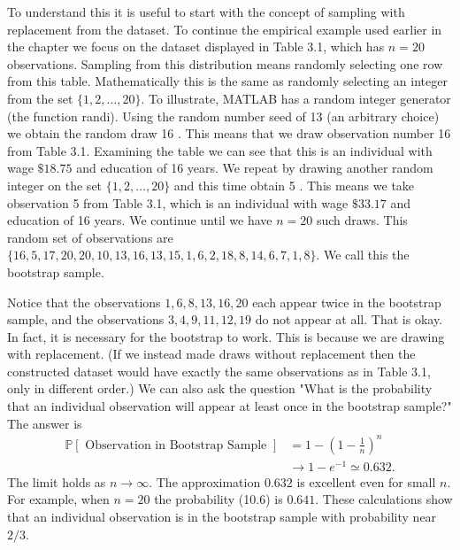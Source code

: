 \documentclass[10pt]{article}
\begin{document}
To understand this it is useful to start with the concept of sampling with replacement from the dataset. To continue the empirical example used earlier in the chapter we focus on the dataset displayed in Table 3.1, which has $n=20$ observations. Sampling from this distribution means randomly selecting one row from this table. Mathematically this is the same as randomly selecting an integer from the set $\{1,2, \ldots, 20\}$. To illustrate, MATLAB has a random integer generator (the function randi). Using the random number seed of 13 (an arbitrary choice) we obtain the random draw 16 . This means that we draw observation number 16 from Table 3.1. Examining the table we can see that this is an individual with wage $\$ 18.75$ and education of 16 years. We repeat by drawing another random integer on the set $\{1,2, \ldots, 20\}$ and this time obtain 5 . This means we take observation 5 from Table 3.1, which is an individual with wage $\$ 33.17$ and education of 16 years. We continue until we have $n=20$ such draws. This random set of observations are $\{16,5,17,20,20,10,13,16,13,15,1,6,2,18,8,14,6,7,1,8\}$. We call this the bootstrap sample.

Notice that the observations $1,6,8,13,16,20$ each appear twice in the bootstrap sample, and the observations $3,4,9,11,12,19$ do not appear at all. That is okay. In fact, it is necessary for the bootstrap to work. This is because we are drawing with replacement. (If we instead made draws without replacement then the constructed dataset would have exactly the same observations as in Table 3.1, only in different order.) We can also ask the question "What is the probability that an individual observation will appear at least once in the bootstrap sample?" The answer is
$$
\begin{aligned}
\mathbb{P}[\text { Observation in Bootstrap Sample }] &=1-\left(1-\frac{1}{n}\right)^{n} \\
& \rightarrow 1-e^{-1} \simeq 0.632 .
\end{aligned}
$$
The limit holds as $n \rightarrow \infty$. The approximation $0.632$ is excellent even for small $n$. For example, when $n=20$ the probability (10.6) is $0.641$. These calculations show that an individual observation is in the bootstrap sample with probability near $2 / 3$.
\end{document}
